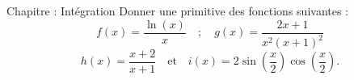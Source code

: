 Chapitre : Intégration
Donner une primitive des fonctions suivantes :
\[ f(x) = \frac{\ln(x)}{x} \quad ; \quad  g(x) = \frac{2x + 1}{x^2(x + 1)^2}\]
\[ h(x) = \frac{x+2}{x+1} \quad \text{et} \quad i(x) = 2 \sin \left( \frac{x}{2} \right) \cos \left( \frac{x}{2} \right).\]